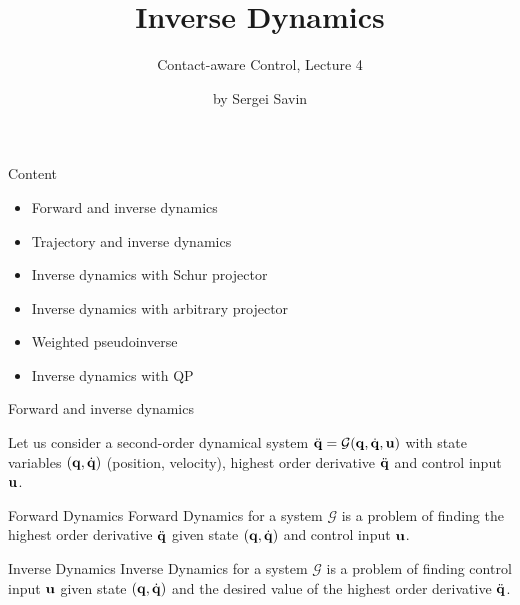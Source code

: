 \documentclass{beamer}
\title{Inverse Dynamics}
\subtitle{Contact-aware Control, Lecture 4}
\author{by Sergei Savin}
\date{\mydate}
\begin{document}
\maketitle


\begin{frame}{Content}

\begin{itemize}
\item Forward and inverse dynamics
\item Trajectory and inverse dynamics
\item Inverse dynamics with Schur projector
\item Inverse dynamics with arbitrary projector
\item Weighted pseudoinverse
\item Inverse dynamics with QP
\end{itemize}

\end{frame}




\begin{frame}{Forward and inverse dynamics}
	\begin{flushleft}
		
		Let us consider a second-order dynamical system $\ddot{\mathbf{q}} = \mathcal{G}(\mathbf{q}, \dot{\mathbf{q}}, \mathbf{u})$ with state variables $(\mathbf{q}, \dot{\mathbf{q}})$ (position, velocity), highest order derivative $\ddot{\mathbf{q}}$ and control input $\mathbf{u}$.
		
		\bigskip
		
		\begin{block}{Forward Dynamics}
			Forward Dynamics for a system $\mathcal{G}$ is a problem of finding the highest order derivative $\ddot{\mathbf{q}}$ given state $(\mathbf{q}, \dot{\mathbf{q}})$ and control input $\mathbf{u}$.
		\end{block} 
		
		\bigskip
		
		\begin{block}{Inverse Dynamics}
			Inverse Dynamics for a system $\mathcal{G}$ is a problem of finding control input $\mathbf{u}$ given state $(\mathbf{q}, \dot{\mathbf{q}})$ and the desired value of the highest order derivative $\ddot{\mathbf{q}}$.
		\end{block} 
	
	\end{flushleft}
\end{frame}
\end{document}
